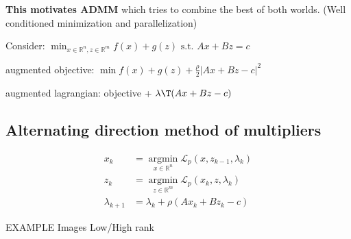 \textbf{This motivates ADMM} which tries to combine
the best of both worlds.
(Well conditioned minimization and parallelization)


Consider:
$\min_{x \in \mathbb{R}^{n},z \in \mathbb{R}^{m}} f(x) + g(z)
	\text{ s.t. } Ax+Bz=c$

augmented objective:
$\min f(x) + g(z)+\frac{\rho}{2}|Ax+Bz-c|^2$


augmented lagrangian: objective +
$\lambda\T(Ax+Bz-c)$

\subsection{Alternating direction method  of multipliers}

$$\begin{aligned}
		x_k           & =\underset{x \in \mathbb{R}^{n} }{\operatorname{argmin}}\mathcal{L}_p(x,z_{k-1},\lambda_k)
		\\
		z_k           & =\underset{z \in \mathbb{R}^{m} }{\operatorname{argmin}}\mathcal{L}_p(x_k,z,\lambda_k)
		\\
		\lambda_{k+1} & =\lambda_k+\rho(Ax_k+Bz_k-c)
	\end{aligned}$$

EXAMPLE Images Low/High rank
